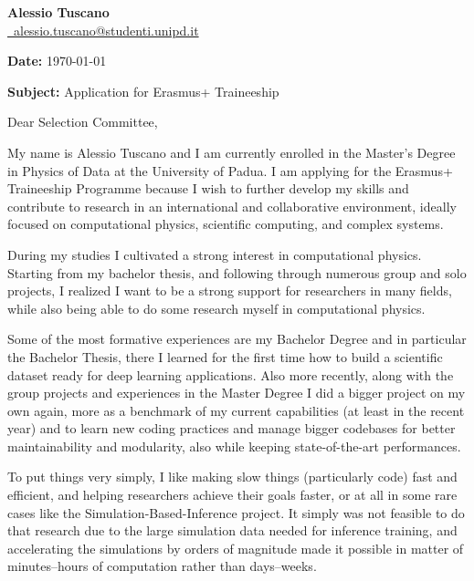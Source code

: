 \documentclass[a4paper,11pt]{article}
\begin{document}
\begin{flushright}
\textbf{Alessio Tuscano}\\
\href{mailto:alessio.tuscano@studenti.unipd.it}{\raisebox{-0.05\height}\faEnvelope \ alessio.tuscano@studenti.unipd.it} \\
\end{flushright}

\vspace{.5em}
\noindent
\textbf{Date:} \today

\vspace{.5em}
\noindent
\textbf{Subject:} Application for Erasmus+ Traineeship

\vspace{1em}
\noindent
Dear Selection Committee,

My name is Alessio Tuscano and I am currently enrolled in the Master’s Degree in Physics of Data at the University of Padua. I am applying for the Erasmus+ Traineeship Programme because I wish to further develop my skills and contribute to research in an international and collaborative environment, ideally focused on computational physics, scientific computing, and complex systems.

During my studies I cultivated a strong interest in computational physics. Starting from my bachelor thesis, and following through numerous group and solo projects, I realized I want to be a strong support for researchers in many fields, while also being able to do some research myself in computational physics.

Some of the most formative experiences are my Bachelor Degree and in particular the Bachelor Thesis, there I learned for the first time how to build a scientific dataset ready for deep learning applications. Also more recently, along with the group projects and experiences in the Master Degree I did a bigger project on my own again, more as a benchmark of my current capabilities (at least in the recent year) and to learn new coding practices and manage bigger codebases for better maintainability and modularity, also while keeping state-of-the-art performances.

To put things very simply, I like making slow things (particularly code) fast and efficient, and helping researchers achieve their goals faster, or at all in some rare cases like the Simulation-Based-Inference project. It simply was not feasible to do that research due to the large simulation data needed for inference training, and accelerating the simulations by orders of magnitude made it possible in matter of minutes--hours of computation rather than days--weeks.
\end{document}
